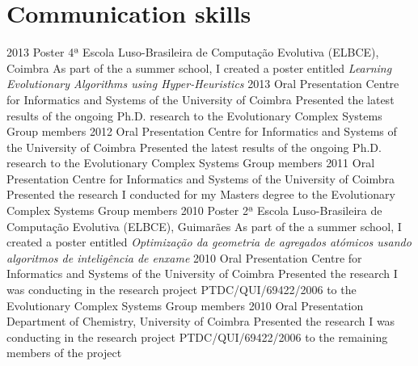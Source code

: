 \documentclass[]{friggeri-cv} %
\begin{document}
\section{Communication skills}

\begin{entrylist}
\entry
{2013}
{Poster}
{4ª Escola Luso-Brasileira de Computação Evolutiva (ELBCE), Coimbra}
{As part of the a summer school, I created a poster entitled \emph{Learning Evolutionary Algorithms using Hyper-Heuristics}}
\entry
{2013}
{Oral Presentation}
{Centre for Informatics and Systems of the University of Coimbra}
{Presented the latest results of the ongoing Ph.D. research to the Evolutionary Complex Systems Group members}
\entry
{2012}
{Oral Presentation}
{Centre for Informatics and Systems of the University of Coimbra}
{Presented the latest results of the ongoing Ph.D. research to the Evolutionary Complex Systems Group members}
\entry
{2011}
{Oral Presentation}
{Centre for Informatics and Systems of the University of Coimbra}
{Presented the research I conducted for my Masters degree to the Evolutionary Complex Systems Group members}
\entry
{2010}
{Poster}
{2ª Escola Luso-Brasileira de Computação Evolutiva (ELBCE), Guimarães}
{As part of the a summer school, I created a poster entitled \emph{Optimização da geometria de agregados atómicos usando algoritmos de inteligência de enxame}}
\entry
{2010}
{Oral Presentation}
{Centre for Informatics and Systems of the University of Coimbra}
{Presented the research I was conducting in the research project PTDC/QUI/69422/2006 to the Evolutionary Complex Systems Group members}
\entry
{2010}
{Oral Presentation}
{Department of Chemistry, University of Coimbra}
{Presented the research I was conducting in the research project PTDC/QUI/69422/2006 to the remaining members of the project}
\end{entrylist}

\vfill\eject

\end{document}
